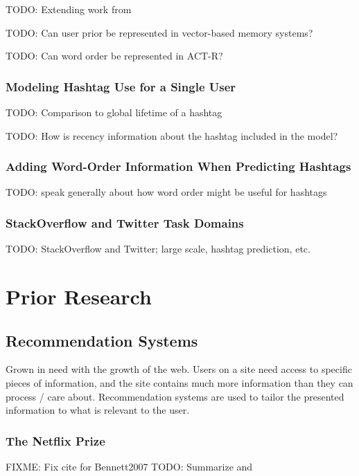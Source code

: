 \documentclass[man]{apa6}
\begin{document}
TODO: Extending work from \cite{Rutledge2008}

TODO: Can user prior be represented in vector-based memory systems?

TODO: Can word order be represented in ACT-R?

\subsubsection{Modeling Hashtag Use for a Single User}

TODO: Comparison to global lifetime of a hashtag \cite{Tsur2012}

TODO: How is recency information about the hashtag included in the model?

\subsubsection{Adding Word-Order Information When Predicting Hashtags}

TODO: speak generally about how word order might be useful for hashtags

\subsubsection{StackOverflow and Twitter Task Domains}

TODO: StackOverflow and Twitter; large scale, hashtag prediction, etc. 

\section{Prior Research}

\subsection{Recommendation Systems}

Grown in need with the growth of the web.
Users on a site need access to specific pieces of information, and the site contains much more information than they can process / care about.
Recommendation systems are used to tailor the presented information to what is relevant to the user.
\cite{Pazzani2007}

\subsubsection{The Netflix Prize}

FIXME: Fix cite for Bennett2007
TODO: Summarize and \cite{Bennett2007}
\end{document}
